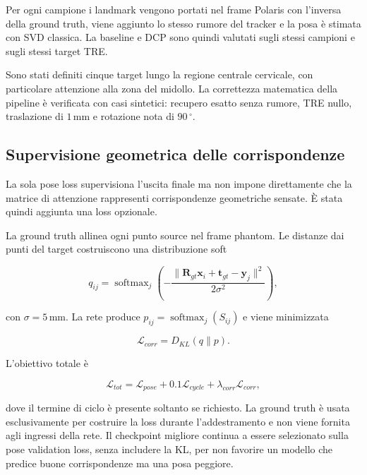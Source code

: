 \documentclass[11pt,a4paper]{article}
\newcommand{\R}{\mathbf{R}}
\newcommand{\tvec}{\mathbf{t}}
\newcommand{\x}{\mathbf{x}}
\newcommand{\y}{\mathbf{y}}
\newcommand{\SI}[2]{\ensuremath{#1\,#2}}
\newcommand{\milli}{\mathrm{m}}
\newcommand{\metre}{\mathrm{m}}
\newcommand{\degree}{^\circ}
\begin{document}
Per ogni campione i landmark vengono portati nel frame Polaris con l'inversa
della ground truth, viene aggiunto lo stesso rumore del tracker e la posa è
stimata con SVD classica. La baseline e DCP sono quindi valutati sugli stessi
campioni e sugli stessi target TRE.

Sono stati definiti cinque target lungo la regione centrale cervicale, con
particolare attenzione alla zona del midollo. La correttezza matematica della
pipeline è verificata con casi sintetici: recupero esatto senza rumore, TRE
nullo, traslazione di \SI{1}{\milli\metre} e rotazione nota di
\SI{90}{\degree}.

\subsection{Supervisione geometrica delle corrispondenze}

La sola pose loss supervisiona l'uscita finale ma non impone direttamente che
la matrice di attenzione rappresenti corrispondenze geometriche sensate. È
stata quindi aggiunta una loss opzionale.

La ground truth allinea ogni punto source nel frame phantom. Le distanze dai
punti del target costruiscono una distribuzione soft

\begin{equation}
    q_{ij}=\operatorname{softmax}_j\left(
      -\frac{\|\R_{gt}\x_i+\tvec_{gt}-\y_j\|^2}{2\sigma^2}
    \right),
\end{equation}

con $\sigma=\SI{5}{\milli\metre}$. La rete produce
$p_{ij}=\operatorname{softmax}_j(S_{ij})$ e viene minimizzata

\begin{equation}
    \mathcal{L}_{corr}=D_{KL}(q\|p).
\end{equation}

L'obiettivo totale è

\begin{equation}
    \mathcal{L}_{tot}=\mathcal{L}_{pose}
    +0.1\mathcal{L}_{cycle}
    +\lambda_{corr}\mathcal{L}_{corr},
\end{equation}

dove il termine di ciclo è presente soltanto se richiesto. La ground truth è
usata esclusivamente per costruire la loss durante l'addestramento e non viene
fornita agli ingressi della rete. Il checkpoint migliore continua a essere
selezionato sulla pose validation loss, senza includere la KL, per non favorire
un modello che predice buone corrispondenze ma una posa peggiore.
\end{document}
